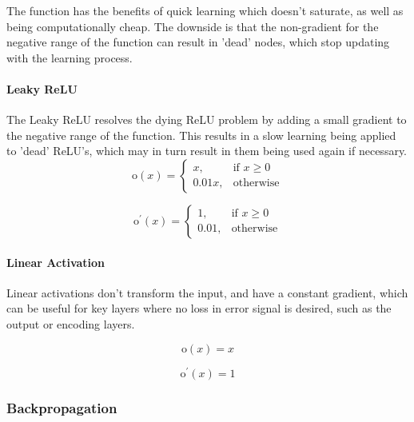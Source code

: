 \documentclass[a4paper,11pt,oneside]{article}
\theoremstyle{plain}
\theoremstyle{definition}
\begin{document}
The function has the benefits of quick learning which doesn't saturate, as well as being computationally cheap. The downside is that the non-gradient for the negative range of the function can result in 'dead' nodes, which stop updating with the learning process.

\paragraph{Leaky ReLU}

The Leaky ReLU resolves the dying ReLU problem by adding a small gradient to the negative range of the function. This results in a slow learning being applied to 'dead' ReLU's, which may in turn result in them being used again if necessary.
\begin{equation}\end{equation}\label{func_leaky_relu}
\[
\mathrm{o}(x)= 
\begin{cases}
x,& \text{if } x\geq 0\\
0.01x,              & \text{otherwise}
\end{cases}
\]

\begin{equation}\end{equation}\label{func_leaky_relu_prime}
\[
\mathrm{o}^\prime(x)= 
\begin{cases}
1,& \text{if } x\geq 0\\
0.01,              & \text{otherwise}
\end{cases}
\]

\paragraph{Linear Activation}

Linear activations don't transform the input, and have a constant gradient, which can be useful for key layers where no loss in error signal is desired, such as the output or encoding layers.

\begin{equation}\label{func_linear}
\mathrm{o}(x) = x
\end{equation}

\begin{equation}\label{func_linear_prime}
\mathrm{o}^\prime(x) = 1
\end{equation}

\subsubsection{Backpropagation}\label{imp_backprop}
\end{document}
